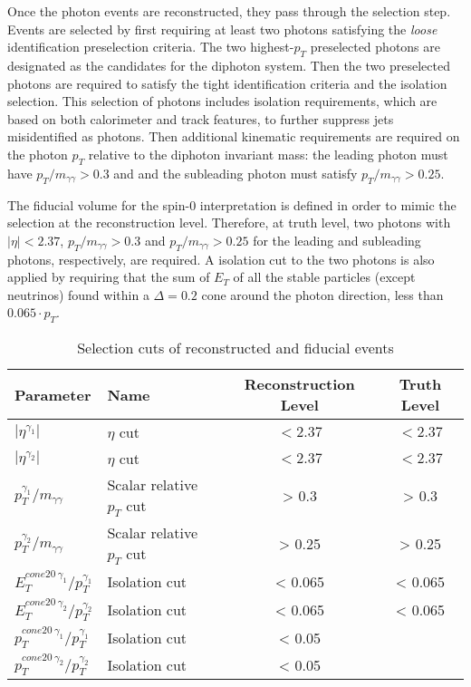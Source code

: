 \documentclass[a4paper, oneside, 11pt, openright]{book}
\begin{document}
 			Once the photon events are reconstructed, they pass through the selection step. Events are selected by first requiring at least two photons satisfying the \textit{loose} identification preselection criteria. The two highest-$p_T$ preselected photons are designated as the candidates for the diphoton system. Then the two preselected photons are required to satisfy the tight identification criteria and the isolation selection. This selection of photons includes isolation requirements, which are based on both calorimeter and track features, to further suppress jets misidentified as photons. Then additional kinematic requirements are required on the photon $p_T$ relative to the diphoton invariant mass: the leading photon must have $p_T/m_{\gamma\gamma} > 0.3$ and and the subleading photon must satisfy $p_T/m_{\gamma\gamma} > 0.25$.
 			
 			The fiducial volume for the spin-0 interpretation is defined in order to mimic the selection at the reconstruction level. Therefore, at truth level, two photons with $|\eta|<2.37$, $p_T/m_{\gamma\gamma} > 0.3$ and $p_T/m_{\gamma\gamma} > 0.25$ for the leading and subleading photons, respectively, are required. A isolation cut to the two photons is also applied by requiring that the sum of $E_T$ of all the stable particles (except neutrinos) found within a $\Delta = 0.2$ cone around the photon direction, less than $0.065\cdot p_T$. 
 			
 			
 			\begin{table}[tbp]
 				\centering
					\begin{tabular}{llcc}
						\toprule[1.5pt]
						Parameter									& Name						& Reconstruction Level	& Truth Level		\\
						\midrule
						$|\eta^{\gamma_1}|$							& $\eta$ cut				& $<2.37$ 				& $<2.37$			\\
						$|\eta^{\gamma_2}|$							& $\eta$ cut				& $<2.37$ 				& $<2.37$			\\
						$p_T^{\gamma_1}/m_{\gamma\gamma}$			& Scalar relative $p_T$ cut & > 0.3					& > 0.3    			\\
						$p_T^{\gamma_2}/m_{\gamma\gamma}$			& Scalar relative $p_T$ cut & > 0.25				& > 0.25			\\
						$E_{T}^{cone20\ \gamma_1}/p_T^{\gamma_1}$ 	& Isolation cut 			& < 0.065				& < 0.065 			\\
						$E_{T}^{cone20\ \gamma_2}/p_T^{\gamma_2}$ 	& Isolation cut 			& < 0.065				& < 0.065			\\
						$p_{T}^{cone20\ \gamma_1}/p_T^{\gamma_1}$ 	& Isolation cut 			& < 0.05				& 		 			\\
						$p_{T}^{cone20\ \gamma_2}/p_T^{\gamma_2}$ 	& Isolation cut 			& < 0.05				& 					\\
						\bottomrule[1.5pt]
					\end{tabular}
 				\caption{Selection cuts of reconstructed and fiducial events }
 			\end{table}
 		
\end{document}
